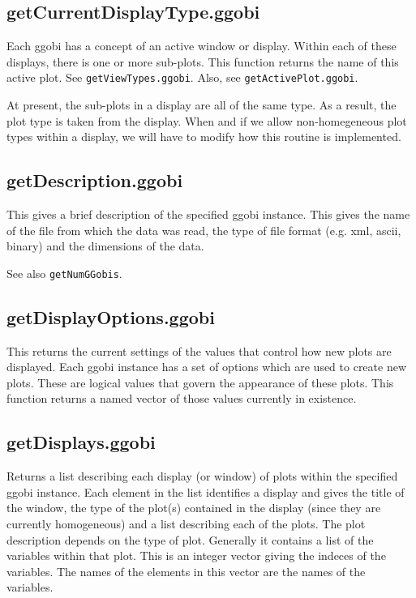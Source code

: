 \documentclass{article}
\def\SFunction#1{{\texttt{\red #1}}}
\begin{document}
\subsection{getCurrentDisplayType.ggobi}
Each ggobi has a concept of an active window or display. Within each
of these displays, there is one or more sub-plots.  This function
returns the name of this active plot.  See
\SFunction{getViewTypes.ggobi}.  Also, see
\SFunction{getActivePlot.ggobi}.

At present, the sub-plots in a display are all of the same type. As a
result, the plot type is taken from the display.  When and if we allow
non-homegeneous plot types within a display, we will have to modify
how this routine is implemented.

\subsection{getDescription.ggobi}
This gives a brief description of the specified ggobi instance.  This
gives the name of the file from which the data was read, the type of
file format (e.g. xml, ascii, binary) and the dimensions of the data.

See also \SFunction{getNumGGobis}.

\subsection{getDisplayOptions.ggobi}
This returns the current settings of the values that control how new
plots are displayed.  Each ggobi instance has a set of options which
are used to create new plots.  These are logical values that govern
the appearance of these plots.  This function returns a named vector
of those values currently in existence.

\subsection{getDisplays.ggobi}
Returns a list describing each display (or window) of plots within the
specified ggobi instance.  Each element in the list identifies a
display and gives the title of the window, the type of the plot(s)
contained in the display (since they are currently homogeneous) and a
list describing each of the plots.  The plot description depends on
the type of plot. Generally it contains a list of the variables within
that plot.  This is an integer vector giving the indeces of the
variables. The names of the elements in this vector are the names of
the variables. 
\end{document}
